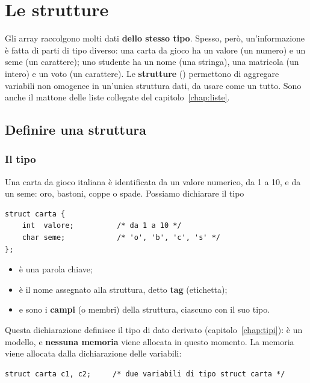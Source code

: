 \chapter{Le strutture}
\label{chap:strutture}

Gli array raccolgono molti dati \textbf{dello stesso tipo}. Spesso, però,
un'informazione è fatta di parti di tipo diverso: una carta da gioco ha un
valore (un numero) e un seme (un carattere); uno studente ha un nome (una
stringa), una matricola (un intero) e un voto (un carattere). Le
\textbf{strutture} () permettono di aggregare variabili non
omogenee in un'unica struttura dati, da usare come un tutto. Sono anche il
mattone delle liste collegate del capitolo~\ref{chap:liste}.

\section{Definire una struttura}

\subsection{Il tipo }

Una carta da gioco italiana è identificata da un valore numerico, da 1 a 10,
e da un seme: oro, bastoni, coppe o spade. Possiamo dichiarare il tipo

\begin{lstlisting}[style=c]
struct carta {
    int  valore;          /* da 1 a 10 */
    char seme;            /* 'o', 'b', 'c', 's' */
};
\end{lstlisting}

\begin{itemize}
  \item {} è una parola chiave;
  \item {} è il nome assegnato alla struttura, detto
        \textbf{tag} (etichetta);
  \item {} e  sono i \textbf{campi} (o membri) della
        struttura, ciascuno con il suo tipo.
\end{itemize}

Questa dichiarazione definisce il tipo di dato derivato 
(capitolo~\ref{chap:tipi}): è un modello, e \textbf{nessuna memoria} viene
allocata in questo momento. La memoria viene allocata dalla dichiarazione
delle variabili:

\begin{lstlisting}[style=c]
struct carta c1, c2;     /* due variabili di tipo struct carta */
\end{lstlisting}

